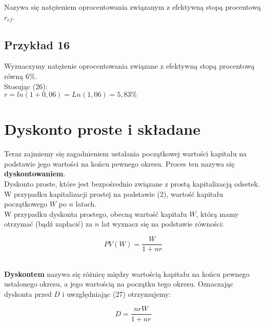 \documentclass{article}
\begin{document}
Nazywa się natężeniem oprocentowania związanym z efektywną stopą procentową $ r_{ef} $.

\subsection{Przykład 16}

Wyznaczymy natężenie oprocentowania związane z efektywną stopą procentową równą $ 6 \% $.\\

Stosując (26):\\

$ r = ln(1 + 0,06) = Ln(1,06) = 5,83 \% $\\

\newpage

%
%

\section{Dyskonto proste i składane}

Teraz zajmiemy się zagadnieniem ustalania początkowej wartości kapitału na podstawie jego wartości na końcu pewnego okresu. Proces ten nazywa się \textbf{dyskontowaniem}.\\

Dyskonto proste, które jest bezpośrednio związane z prostą kapitalizacją odsetek. W przypadku kapitalizacji prostej na podstawie (2), wartość kapitału początkowego $ W $ po $ n $ latach.\\

W przypadku dyskonta prostego, obecną wartość kapitału $ W $, którą mamy otrzymać (bądź zapłacić) za $ n $ lat wyznacz się na podstawie równości:

\begin{center}
	\begin{equation}
		PV(W) = \frac{W}{1 + nr}
	\end{equation}
\end{center}\\

\textbf{Dyskontem} nazywa się różnicę między wartością kapitału na końcu pewnego ustalonego okresu, a jego wartością na początku tego okresu. Oznaczając dyskonta przed $ D $ i uwzględniając (27) otrzymujemy:

\begin{center}
	\begin{equation}
		D = \frac{nrW}{1 + nr}
	\end{equation}
\end{center}\\
\end{document}
